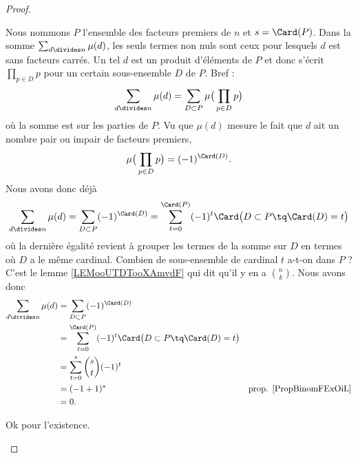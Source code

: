 \begin{proof}
\begin{subproof}
\begin{subproof}
			\spitem[Pour \( n>1\)]
			Nous nommons \( P\) l'ensemble des facteurs premiers de \( n\) et \( s=\Card(P)\). Dans la somme \( \sum_{d\divides n}\mu(d)\), les seuls termes non nuls sont ceux pour lesquels \( d\) est sans facteurs carrés. Un tel \( d\) est un produit d'éléments de \( P\) et donc s'écrit \( \prod_{p\in D}p\) pour un certain sous-ensemble \( D\) de \( P\). Bref :
			\begin{equation}
				\sum_{d\divides n}\mu(d)=\sum_{D\subset P}\mu\big( \prod_{p\in D}p \big)
			\end{equation}
			où la somme est sur les parties de \( P\). Vu que \( \mu(d)\) mesure le fait que \( d\) ait un nombre pair ou impair de facteurs premiers,
			\begin{equation}
				\mu\big( \prod_{p\in D}p \big)=(-1)^{\Card(D)}.
			\end{equation}
			Nous avons donc déjà
			\begin{equation}
				\sum_{d\divides n}\mu(d)=\sum_{D\subset P}(-1)^{\Card(D)}=\sum_{t=0}^{\Card(P)}(-1)^t\Card\big( D\subset P\tq\Card(D)=t \big)
			\end{equation}
			où la dernière égalité revient à grouper les termes de la somme sur \( D\) en termes où \( D\) a le même cardinal. Combien de sous-ensemble de cardinal \( t\) a-t-on dans \( P\) ? C'est le lemme \ref{LEMooUTDTooXAmvdF} qui dit qu'il y en a \( \binom{ n }{ k }\). Nous avons donc
			\begin{subequations}
				\begin{align}
					\sum_{d\divides n}\mu(d) & =\sum_{D\subset P}(-1)^{\Card(D)}                                                                         \\
					                         & =\sum_{t=0}^{\Card(P)}(-1)^t\Card\big( D\subset P\tq\Card(D)=t \big)                                      \\
					                         & =\sum_{t=0}^s\binom{ s }{ t }(-1)^t                                                                       \\
					                         & =(-1+1)^s                                                            & \text{prop. \ref{PropBinomFExOiL}} \\
					                         & =0.
				\end{align}
			\end{subequations}
		\end{subproof}
		Ok pour l'existence.


\end{subproof}
\end{proof}
